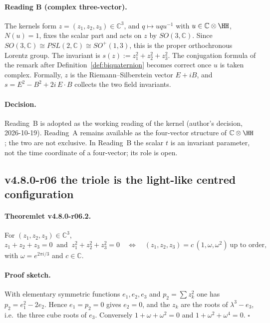 \paragraph{Reading B (complex three-vector).}
The kernels form \(z=(z_1,z_2,z_3)\in\mathbb C^3\), and \(q\mapsto uqu^{-1}\) with
\(u\in\mathbb C\otimes\HH\), \(N(u)=1\), fixes the scalar part and acts on \(z\) by
\(SO(3,\mathbb C)\).  Since \(SO(3,\mathbb C)\cong PSL(2,\mathbb C)\cong SO^+(1,3)\), this is the
proper orthochronous Lorentz group.  The invariant is \(s(z):=z_1^2+z_2^2+z_3^2\).  The conjugation
formula of the remark after Definition~\ref{def:biquaternion} becomes correct once \(u\) is taken
complex.  Formally, \(z\) is the Riemann--Silberstein vector \(E+iB\), and
\(s=E^2-B^2+2i\,E\cdot B\) collects the two field invariants.

\paragraph{Decision.}
Reading~B is adopted as the working reading of the kernel (author's decision, 2026-10-19).
Reading~A remains available as the four-vector structure of \(\mathbb C\otimes\HH\); the two
are not exclusive.  In Reading~B the scalar \(t\) is an invariant parameter, not the time
coordinate of a four-vector; its role is open.

\subsection*{v4.8.0-r06 the triole is the light-like centred configuration}
\label{subsec:v480-r06-triole-lemma}

\paragraph{Theoremlet v4.8.0-r06.2.}
For \((z_1,z_2,z_3)\in\mathbb C^3\),
\[
z_1+z_2+z_3=0\ \text{ and }\ z_1^2+z_2^2+z_3^2=0
\quad\Longleftrightarrow\quad
(z_1,z_2,z_3)=c\,(1,\omega,\omega^2)\ \text{up to order},
\]
with \(\omega=e^{2\pi i/3}\) and \(c\in\mathbb C\).

\paragraph{Proof sketch.}
With elementary symmetric functions \(e_1,e_2,e_3\) and \(p_2=\sum z_k^2\) one has
\(p_2=e_1^2-2e_2\).  Hence \(e_1=p_2=0\) gives \(e_2=0\), and the \(z_k\) are the roots of
\(\lambda^3-e_3\), i.e.\ the three cube roots of \(e_3\).  Conversely \(1+\omega+\omega^2=0\) and
\(1+\omega^2+\omega^4=0\).  \(\square\)


